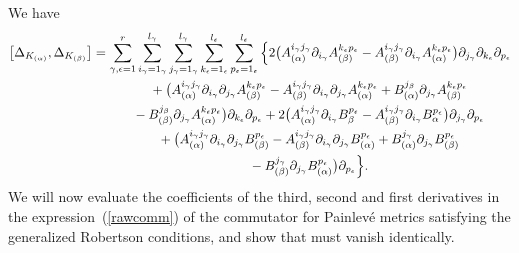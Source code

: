 \documentclass[pdftex]{sigma}
\numberwithin{equation}{section}
\newcommand{\jbeta}{j_{\beta}}
\newcommand{\igamma}{i_{\gamma}}
\newcommand{\jgamma}{j_{\gamma}}
\newcommand{\lgamma}{l_{\gamma}}
\newcommand{\kepsilon}{k_{\epsilon}}
\newcommand{\pepsilon}{p_{\epsilon}}
\newcommand{\lepsilon}{l_{\epsilon}}
\begin{document}
We have
\begin{gather}
\big[\Delta_{K_{(\alpha)}},\Delta_{K_{(\beta)}}\big] =\sum_{\gamma,\epsilon=1}^{r}\sum_{\igamma = 1_{\gamma}}^{\lgamma}\sum_{\jgamma = 1_{\gamma}}^{\lgamma}\sum_{\kepsilon =1_{\epsilon}}^{\lepsilon}\sum_{\pepsilon =1_{\epsilon}}^{\lepsilon}\Big\{2\big(A_{(\alpha)}^{\igamma \jgamma}\partial_{\igamma}A_{(\beta)}^{\kepsilon \pepsilon}-A_{(\beta)}^{\igamma \jgamma}\partial_{\igamma}A_{(\alpha)}^{\kepsilon \pepsilon}\big)\partial_{\jgamma}\partial_{\kepsilon}\partial_{\pepsilon}\nonumber\\
\hphantom{\big[\Delta_{K_{(\alpha)}},\Delta_{K_{(\beta)}}\big] =}{}
+\big(A_{(\alpha)}^{\igamma \jgamma}\partial_{\igamma}\partial_{\jgamma}A_{(\beta)}^{\kepsilon \pepsilon}-A_{(\beta)}^{\igamma \jgamma}\partial_{\igamma}\partial_{\jgamma}A_{(\alpha)}^{\kepsilon \pepsilon}+B_{(\alpha)}^{\jbeta}\partial_{\jgamma}A_{(\beta)}^{\kepsilon \pepsilon}\nonumber\\
\hphantom{\big[\Delta_{K_{(\alpha)}},\Delta_{K_{(\beta)}}\big] =}{}
-B_{(\beta)}^{\jbeta}\partial_{\jgamma}A_{(\alpha)}^{\kepsilon \pepsilon}\big)\partial_{\kepsilon}\partial_{\pepsilon}
+2\big(A_{(\alpha)}^{\igamma \jgamma}\partial_{\igamma}B_{\beta}^{\pepsilon}-A_{(\beta)}^{\igamma \jgamma}\partial_{\igamma}B_{\alpha}^{\pepsilon}\big)\partial_{\jgamma}\partial_{\pepsilon}\nonumber\\
\hphantom{\big[\Delta_{K_{(\alpha)}},\Delta_{K_{(\beta)}}\big] =}{}
+\big(A_{(\alpha)}^{\igamma \jgamma}\partial_{\igamma}\partial_{\jgamma}B_{(\beta)}^{\pepsilon}-A_{(\beta)}^{\igamma \jgamma}\partial_{\igamma}\partial_{\jgamma}B_{(\alpha)}^{\pepsilon}+B_{(\alpha)}^{\jgamma} \partial_{\jgamma}B_{(\beta)}^{\pepsilon}\nonumber\\
\hphantom{\big[\Delta_{K_{(\alpha)}},\Delta_{K_{(\beta)}}\big] =}{}
-B_{(\beta)}^{\jgamma}\partial_{\jgamma}B_{(\alpha)}^{\pepsilon}\big)\partial_{\pepsilon}\Big\}.
\label{rawcomm}
\end{gather}
We will now evaluate the coefficients of the third, second and first derivatives in the expres\-sion~(\ref{rawcomm}) of the commutator for Painlev\'e metrics satisfying the generalized Robertson conditions, and show that must vanish identically.
\end{document}
